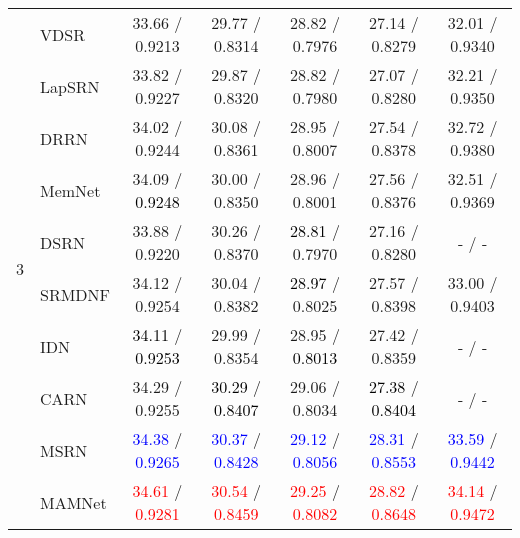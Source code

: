\documentclass[final,5p,times,twocolumn]{elsarticle}
\begin{document}
\begin{table*}[t]
{\begin{tabular}{clccccc}
			\multirow{10}{*}{3} & VDSR \cite{kim2016accurate}  & 33.66 / 0.9213 & 29.77 / 0.8314 & 28.82 / 0.7976 & 27.14 / 0.8279 & 32.01 / 0.9340  \\
			& LapSRN \cite{lai2017laplacian}  & 33.82 / 0.9227 & 29.87 / 0.8320 & 28.82 / 0.7980 & 27.07 /  0.8280 & 32.21 / 0.9350  \\
			& DRRN \cite{tai2017image}  & 34.02 / 0.9244 & 30.08 / 0.8361 & 28.95 / 0.8007 & 27.54 / 0.8378 & 32.72 / 0.9380 \\
			& MemNet \cite{tai2017memnet}  & 34.09 / \textcolor{black}{0.9248} & 30.00 / 0.8350 & 28.96 / 0.8001 & 27.56 / 0.8376 & 32.51 / 0.9369 \\
			& DSRN \cite{han2018image}  & 33.88 / 0.9220 & 30.26 / 0.8370 & \textcolor{black}{28.81} / 0.7970 & 27.16 / 0.8280 & - / - \\
			& SRMDNF \cite{zhang2018learning} & 34.12 / 0.9254 & 30.04 / 0.8382 & \textcolor{black}{28.97} / 0.8025 & 27.57 / 0.8398 & 33.00 / 0.9403  \\
			& IDN \cite{hui2018fast} & \textcolor{black}{34.11} / \textcolor{black}{0.9253} & 29.99 / 0.8354 & 28.95 / \textcolor{black}{0.8013} & 27.42 / 0.8359 & - / - \\
			& CARN \cite{ahn2018fast} & 34.29 / 0.9255 & \textcolor{black}{30.29} / \textcolor{black}{0.8407} & 29.06 / 0.8034 & \textcolor{black}{27.38} / \textcolor{black}{0.8404} & - / - \\		
			& MSRN~\cite{li2018multi} & \textcolor{blue}{34.38} / \textcolor{blue}{0.9265} & \textcolor{blue}{30.37} / \textcolor{blue}{0.8428} & \textcolor{blue}{29.12} / \textcolor{blue}{0.8056} & \textcolor{blue}{28.31} / \textcolor{blue}{0.8553} & \textcolor{blue}{33.59} / \textcolor{blue}{0.9442} \\
			& MAMNet & \textcolor{red}{34.61} / \textcolor{red}{0.9281} & \textcolor{red}{30.54} / \textcolor{red}{0.8459} & \textcolor{red}{29.25} / \textcolor{red}{0.8082} & \textcolor{red}{28.82} / \textcolor{red}{0.8648} & \textcolor{red}{34.14} / \textcolor{red}{0.9472} \\
\midrule
			

\end{tabular}}
\end{table*}
\end{document}
